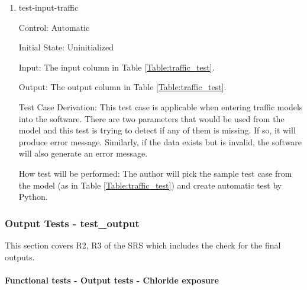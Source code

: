 \documentclass[12pt, titlepage]{article}
\begin{document}
\begin{enumerate}
\item{test-input-traffic\\}

Control: Automatic
					
Initial State: Uninitialized

Input: The input column in Table \ref{Table:traffic_test}.
					
Output: The output column in Table \ref{Table:traffic_test}. 

Test Case Derivation: This test case is applicable when entering traffic models into the software. There are two parameters that would be used from the model and this test is trying to detect if any of them is missing. If so, it will produce error message. Similarly, if the data exists but is invalid, the software will also generate an error message.
					
How test will be performed: The author will pick the sample test case from the model (as in Table \ref{Table:traffic_test}) and create automatic test by Python.
\end{enumerate}

\subsubsection{Output Tests - test\_output}\label{t_output}
This section covers R2, R3 of the SRS which includes the check for the final outputs.

		
\paragraph{Functional tests - Output tests - Chloride exposure}
\end{document}
